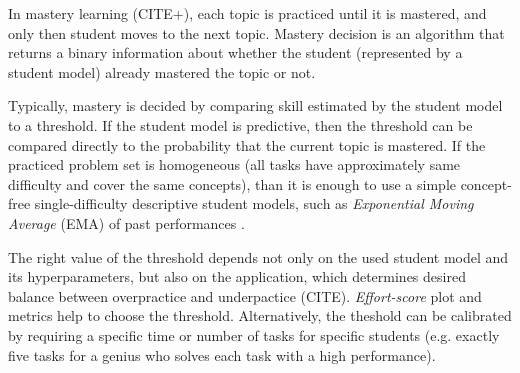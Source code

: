 In mastery learning (CITE+\cite{mastery-learning-scale}), each topic
is practiced until it is mastered, and only then student moves
to the next topic.  %
Mastery decision %
is an algorithm that returns a binary information about whether the student
(represented by a student model) already mastered the topic or not.

Typically, mastery is decided by comparing skill estimated by the student
model to a threshold. %
If the student model is predictive, then the threshold can be compared directly
to the probability that the current topic is mastered.
If the practiced problem set is homogeneous (all tasks have approximately same difficulty
and cover the same concepts), than it is enough to use a simple concept-free
single-difficulty descriptive student models,  %
such as \emph{Exponential Moving Average} (EMA) of past performances
\cite{alg.mastery}.

The right value of the threshold depends not only on the used student model and
its hyperparameters, but also on the application, which determines desired
balance between overpractice and underpactice (CITE).
\emph{Effort-score} plot and metrics
\cite{alg.mastery, evaluation-leopard, learner-models-integration-skills} %
help to choose the threshold.
Alternatively, the theshold can be calibrated by requiring a specific time or
number of tasks for specific students (e.g. exactly five tasks for a genius who
solves each task with a high performance). %


